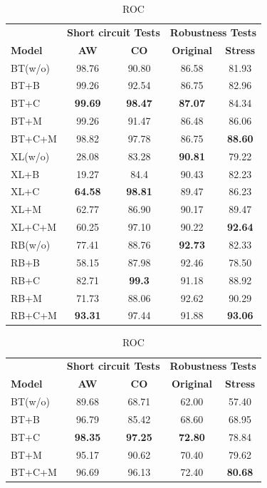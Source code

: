 \begin{table}[th!]
\small
\centering
\begin{subtable}[t]{0.48\textwidth}
\centering
\begin{tabular}{l|cc|cc}\toprule
	& \multicolumn{2}{c|}{\bf Short circuit Tests} & \multicolumn{2}{c}{\bf Robustness Tests} \\ \cline{2-5}
\textbf{Model} &\textbf{AW} &\textbf{CO} & \textbf{Original} &\textbf{Stress}\\ \hline
\rowcolor{Gray}
BT(w/o)&98.76&90.80&86.58&81.93\\
BT+B&99.26&92.54&86.75&82.96\\
BT+C&\textbf{99.69}&\textbf{98.47}&\textbf{87.07}&84.34\\
BT+M&99.26&91.47&86.48&86.06\\
BT+C+M&98.82&97.78&86.75&\textbf{88.60}\\
\midrule

\rowcolor{Gray}
XL(w/o)&28.08&83.28&\textbf{90.81}&79.22\\
XL+B&19.27&84.4&90.43&82.23\\
XL+C&\textbf{64.58}&\textbf{98.81}&89.47&86.23\\
XL+M&62.77&86.90&90.17&89.47\\
XL+C+M&60.25&97.10&90.22&\textbf{92.64}\\
 \midrule
\rowcolor{Gray}
RB(w/o)&77.41&88.76&\textbf{92.73}&82.33\\
RB+B&58.15&87.98&92.46&78.50\\
RB+C&82.71&\textbf{99.3}&91.18&88.92\\
RB+M&71.73&88.06&92.62&90.29\\
RB+C+M&\textbf{93.31}&97.44&91.88&\textbf{93.06}\\
\bottomrule
\end{tabular}
\caption{ROC}
\end{subtable} 
\hfill
\begin{subtable}[t]{0.48\textwidth}
\centering
\begin{tabular}{l|cc|cc}\toprule
	& \multicolumn{2}{c|}{\bf Short circuit Tests} & \multicolumn{2}{c}{\bf Robustness Tests} \\ \cline{2-5}
\textbf{Model} &\textbf{AW} &\textbf{CO} & \textbf{Original} &\textbf{Stress}\\ \hline
\rowcolor{Gray}
BT(w/o)&89.68&68.71&62.00&57.40\\
BT+B&96.79&85.42&68.60&68.95\\
BT+C&\textbf{98.35}&\textbf{97.25}&\textbf{72.80}&78.84\\
BT+M&95.17&90.62&70.40&79.62\\
BT+C+M&96.69&96.13&72.40&\textbf{80.68}\\
\midrule
                     

\end{tabular}
\end{subtable}
\end{table}

